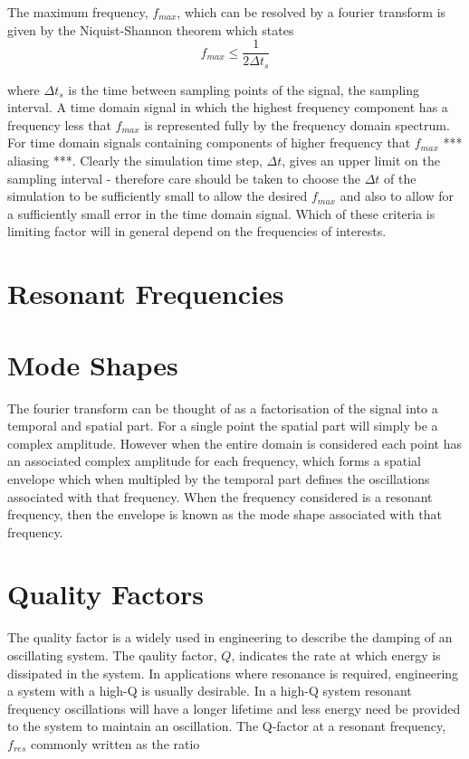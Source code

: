 

The maximum frequency, $f_{max}$, which can be resolved by a fourier transform is given by the Niquist-Shannon theorem which states
$$
f_{max} \leq \frac{1}{2 \Delta t_s}
$$

where $\Delta t_s$ is the time between sampling points of the signal, the sampling interval. A time domain signal in which the highest frequency component has a frequency less that $f_{max}$ is represented fully by the frequency domain spectrum. For time domain signals containing components of higher frequency that $f_{max}$ *** aliasing ***.
Clearly the simulation time step, $\Delta t$, gives an upper limit on the sampling interval - therefore care should be taken to choose the $\Delta t$ of the simulation to be sufficiently small to allow the desired $f_{max}$ and also to allow for a sufficiently small error in the time domain signal. Which of these criteria is limiting factor will in general depend on the frequencies of interests.

\section{Resonant Frequencies}
\section{Mode Shapes}

The fourier transform can be thought of as a factorisation of the signal into a temporal and spatial part. For a single point the spatial part will simply be a complex amplitude. However when the entire domain is considered each point has an associated complex amplitude for each frequency, which forms a spatial envelope which when multipled by the temporal part defines the oscillations associated with that frequency. When the frequency considered is a resonant frequency, then the envelope is known as the mode shape associated with that frequency.

\section{Quality Factors}

The quality factor is a widely used in engineering to describe the damping of an oscillating system. The qaulity factor, $Q$, indicates the rate at which energy is dissipated in the system. In applications where resonance is required, engineering a system with a high-Q is usually desirable. In a high-Q system resonant frequency oscillations will have a longer lifetime and less energy need be provided to the system to maintain an oscillation. The Q-factor at a resonant frequency, $f_{res}$ commonly written as the ratio

